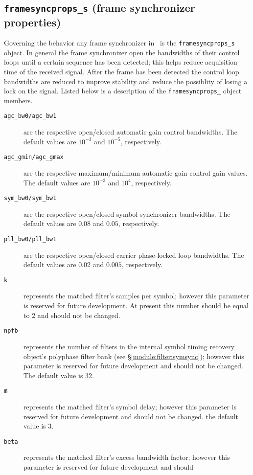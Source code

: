\subsection{{\tt framesyncprops\_s} (frame synchronizer properties)}
\label{module:framing:framesyncprops_s}
Governing the behavior any frame synchronizer in \liquid\ is the
{\tt framesyncprops\_s} object.
In general the frame synchronizer open the bandwidths of their control
loops until a certain sequence has been detected;
this helps reduce acquisition time of the received signal.
After the frame has been detected the control loop bandwidths are
reduced to improve stability and reduce the possiblity of losing a lock
on the signal.
Listed below is a description of the {\tt framesyncprops\_} object
members.
%
\begin{description}
\item[{\tt agc\_bw0/agc\_bw1}]
    are the respective open/closed automatic gain control bandwidths.
    The default values are $10^{-3}$ and $10^{-5}$, respectively.
\item[{\tt agc\_gmin/agc\_gmax}]
    are the respective maximum/minimum automatic gain control gain values.
    The default values are $10^{-3}$ and $10^{4}$, respectively.
\item[{\tt sym\_bw0/sym\_bw1}]
    are the respective open/closed symbol synchronizer bandwidths.
    The default values are $0.08$ and $0.05$, respectively.
\item[{\tt pll\_bw0/pll\_bw1}]
    are the respective open/closed carrier phase-locked loop bandwidths.
    The default values are $0.02$ and $0.005$, respectively.
\item[{\tt k}]
    represents the matched filter's samples per symbol;
    however this parameter is reserved for future development.
    At present this number should be equal to 2 and should not be
    changed.
\item[{\tt npfb}]
    represents the number of filters in the internal symbol timing
    recovery object's polyphase filter bank
    (see \S\ref{module:filter:symsync});
    however this parameter is reserved for future development and should
    not be changed.
    The default value is 32.
\item[{\tt m}]
    represents the matched filter's symbol delay;
    however this parameter is reserved for future development and should
    not be changed.
    the default value is 3.
\item[{\tt beta}]
    represents the matched filter's excess bandwidth factor;
    however this parameter is reserved for future development and should

\end{description}

